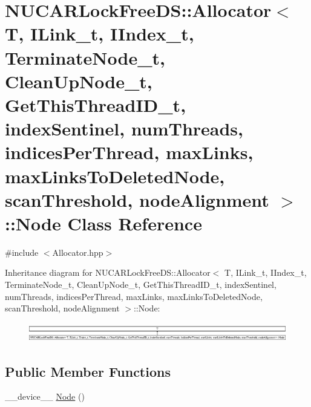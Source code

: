 \hypertarget{class_n_u_c_a_r_lock_free_d_s_1_1_allocator_1_1_node}{}\section{N\+U\+C\+A\+R\+Lock\+Free\+DS\+:\+:Allocator$<$ T, I\+Link\+\_\+t, I\+Index\+\_\+t, Terminate\+Node\+\_\+t, Clean\+Up\+Node\+\_\+t, Get\+This\+Thread\+I\+D\+\_\+t, index\+Sentinel, num\+Threads, indices\+Per\+Thread, max\+Links, max\+Links\+To\+Deleted\+Node, scan\+Threshold, node\+Alignment $>$\+:\+:Node Class Reference}
\label{class_n_u_c_a_r_lock_free_d_s_1_1_allocator_1_1_node}


{\ttfamily \#include $<$Allocator.\+hpp$>$}

Inheritance diagram for N\+U\+C\+A\+R\+Lock\+Free\+DS\+:\+:Allocator$<$ T, I\+Link\+\_\+t, I\+Index\+\_\+t, Terminate\+Node\+\_\+t, Clean\+Up\+Node\+\_\+t, Get\+This\+Thread\+I\+D\+\_\+t, index\+Sentinel, num\+Threads, indices\+Per\+Thread, max\+Links, max\+Links\+To\+Deleted\+Node, scan\+Threshold, node\+Alignment $>$\+:\+:Node\+:\begin{figure}[H]
\begin{center}
\leavevmode
\includegraphics[height=0.841473cm]{class_n_u_c_a_r_lock_free_d_s_1_1_allocator_1_1_node}
\end{center}
\end{figure}
\subsection*{Public Member Functions}
\begin{DoxyCompactItemize}
\item 
\+\_\+\+\_\+device\+\_\+\+\_\+ \mbox{\hyperlink{class_n_u_c_a_r_lock_free_d_s_1_1_allocator_1_1_node_ac6eeee00317554695aed9e4657d222d7}{Node}} ()
\end{DoxyCompactItemize}
